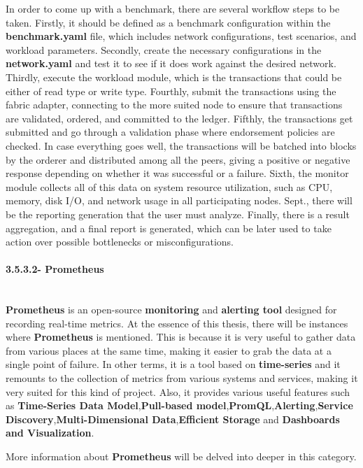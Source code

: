 In order to come up with a benchmark, there are several workflow steps to be taken. Firstly, it should be defined as a benchmark configuration within the \textbf{benchmark.yaml} file, which includes network configurations, test scenarios, and workload parameters. Secondly, create the necessary configurations in the \textbf{network.yaml} and test it to see if it does work against the desired network. Thirdly, execute the workload module, which is the transactions that could be either of read type or write type. Fourthly, submit the transactions using the fabric adapter, connecting to the more suited node to ensure that transactions are validated, ordered, and committed to the ledger. Fifthly, the transactions get submitted and go through a validation phase where endorsement policies are checked. In case everything goes well, the transactions will be batched into blocks by the orderer and distributed among all the peers, giving a positive or negative response depending on whether it was successful or a failure. Sixth, the monitor module collects all of this data on system resource utilization, such as CPU, memory, disk I/O, and network usage in all participating nodes. Sept., there will be the reporting generation that the user must analyze. Finally, there is a result aggregation, and a final report is generated, which can be later used to take action over possible bottlenecks or misconfigurations.

\paragraph{3.5.3.2- Prometheus}\mbox{}\\
\textbf{Prometheus} is an open-source \textbf{monitoring} and \textbf{alerting tool} designed for recording real-time metrics. At the essence of this thesis, there will be instances where \textbf{Prometheus} is mentioned. This is because it is very useful to gather data from various places at the same time, making it easier to grab the data at a single point of failure. In other terms, it is a tool based on \textbf{time-series} and it remounts to the collection of metrics from various systems and services, making it very suited for this kind of project. Also, it provides various useful features such as \textbf{Time-Series Data Model},\textbf{Pull-based model},\textbf{PromQL},\textbf{Alerting},\textbf{Service Discovery},\textbf{Multi-Dimensional Data},\textbf{Efficient Storage} and \textbf{Dashboards and Visualization}.

More information about \textbf{Prometheus} will be delved into deeper in this category.

